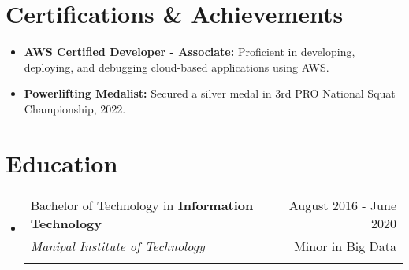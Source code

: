\documentclass[letterpaper,11pt]{article}
\makeatletter
\newcommand{\sectionStart}{
  \begin{itemize}[label={},leftmargin=0in]
}
\newcommand{\sectionEnd}{
  \end{itemize}
}
\newcommand{\educationItem}[5]{
  \vspace{-1pt}
  \item
  \begin{tabular*}{\textwidth}{l@{\extracolsep{\fill}}r@{}}
    \footnotesize{#1 in \textbf{#2}}  & \footnotesize{#3}\\
    \footnotesize{\textit{#4}} & \footnotesize{#5}\\\vspace{-5pt}
  \end{tabular*}
  \vspace{-5pt}
}
\newcommand{\certItem}[2]{
  \item \footnotesize{\textbf{#1} #2} \vspace{-10pt}
}
\makeatother
\begin{document}
\section{Certifications \& Achievements}
\sectionStart
    \certItem 
     {AWS Certified Developer - Associate:} {Proficient in developing, deploying, and debugging cloud-based applications using AWS.}
    \certItem 
     {Powerlifting Medalist:} {Secured a silver medal in 3rd PRO National Squat Championship, 2022.}
\sectionEnd


\section{Education}
\sectionStart
  \educationItem
    {Bachelor of Technology} 
    {Information Technology} 
    {August 2016 - June 2020}
    {Manipal Institute of Technology} 
    {Minor in Big Data}
\sectionEnd
\end{document}
